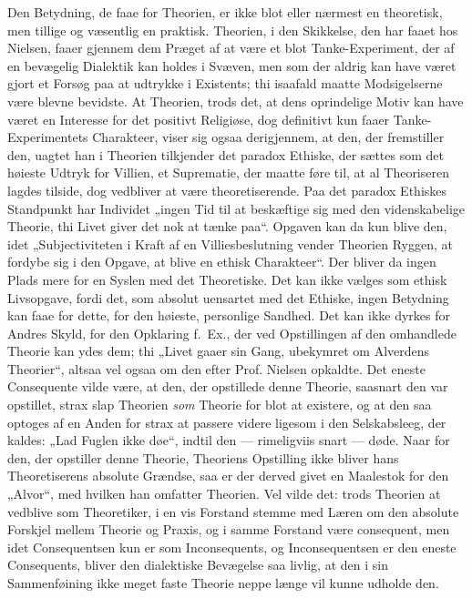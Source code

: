 \documentclass[12pt,a4paper]{book}
\newcommand{\opage}[1]{\marginnote{\footnotesize\textit{[#1]}}}
\begin{document}
Den Betydning, de faae for Theorien, er ikke blot eller nærmest en theoretisk, men tillige og
væsentlig en praktisk. Theorien, i den Skikkelse, den har faaet hos Nielsen, faaer gjennem dem
Præget af at være et blot Tanke-Experiment, der af en bevægelig Dialektik kan holdes i Svæven,
men som der aldrig kan have været gjort et Forsøg paa at udtrykke i Existents; thi isaafald
maatte Modsigelserne være blevne bevidste. At Theorien, trods det, at dens oprindelige Motiv kan
have været en Interesse for det positivt Religiøse, dog definitivt kun faaer Tanke-Experimentets
Charakteer, viser sig ogsaa derigjennem, at den, der fremstiller den, uagtet han i Theorien
tilkjender det paradox Ethiske, der sættes som det høieste Udtryk for Villien, et Suprematie,
der maatte føre til, at al Theoriseren lagdes tilside, dog vedbliver at være theoretiserende.
Paa det paradox Ethiskes Standpunkt har Individet „ingen \opage{215}Tid til at beskæftige sig med den
videnskabelige Theorie, thi Livet giver det nok at tænke paa“. Opgaven kan da kun blive den,
idet „Subjectiviteten i Kraft af en Villiesbeslutning vender Theorien Ryggen, at fordybe sig i
den Opgave, at blive en ethisk Charakteer“. Der bliver da ingen Plads mere for en Syslen med det
Theoretiske. Det kan ikke vælges som ethisk Livsopgave, fordi det, som absolut uensartet med det
Ethiske, ingen Betydning kan faae for dette, for den høieste, personlige Sandhed. Det kan ikke
dyrkes for Andres Skyld, for den Opklaring f.\ Ex., der ved Opstillingen af den omhandlede
Theorie kan ydes dem; thi „Livet gaaer sin Gang, ubekymret om Alverdens Theorier“, altsaa vel
ogsaa om den efter Prof. Nielsen opkaldte. Det eneste Consequente vilde være, at den, der
opstillede denne Theorie, saasnart den var opstillet, strax slap Theorien \emph{som} Theorie for
blot at existere, og at den saa optoges af en Anden for strax at passere videre ligesom i den
Selskabsleeg, der kaldes: „Lad Fuglen ikke døe“, indtil den --- rimeligviis snart --- døde. Naar
for den, der opstiller denne Theorie, Theoriens Opstilling ikke bliver hans Theoretiserens
absolute Grændse, saa er der derved givet en Maalestok for den „Alvor“, med hvilken han omfatter
Theorien. Vel vilde det: trods Theorien at vedblive som Theoretiker, i en vis Forstand stemme
med Læren om den absolute Forskjel mellem Theorie og Praxis, og i samme Forstand være consequent,
men idet Consequentsen kun er som Inconsequents, og Inconsequentsen er den eneste Consequents,
bliver den dialektiske Bevægelse saa livlig, at den i sin Sammenføining ikke meget faste Theorie
neppe længe vil kunne udholde den.
\end{document}
